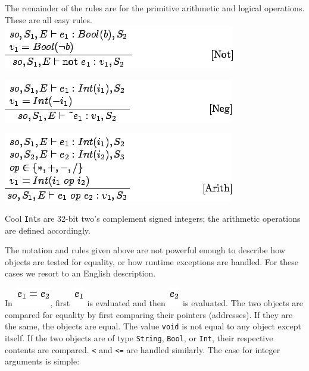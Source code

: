 \documentclass[]{article}
\begin{document}
The remainder of the rules are for the primitive arithmetic and logical
operations. These are all easy rules. \\

\includegraphics{img180.png}

\includegraphics{img182.png}

\includegraphics{img183.png}

Cool \texttt{Int}s are 32-bit two's complement signed integers; the
arithmetic operations are defined accordingly.

The notation and rules given above are not powerful enough to describe
how objects are tested for equality, or how runtime exceptions are
handled. For these cases we resort to an English description.

In \includegraphics{img184.png}, first \includegraphics{img76.png} is
evaluated and then \includegraphics{img92.png} is evaluated. The two
objects are compared for equality by first comparing their pointers
(addresses). If they are the same, the objects are equal. The value
\texttt{void} is not equal to any object except itself. If the two
objects are of type \texttt{String}, \texttt{Bool}, or \texttt{Int},
their respective contents are compared. \texttt{\textless{}} and
\texttt{\textless{}=} are handled similarly. The case for integer
arguments is simple:
\end{document}
